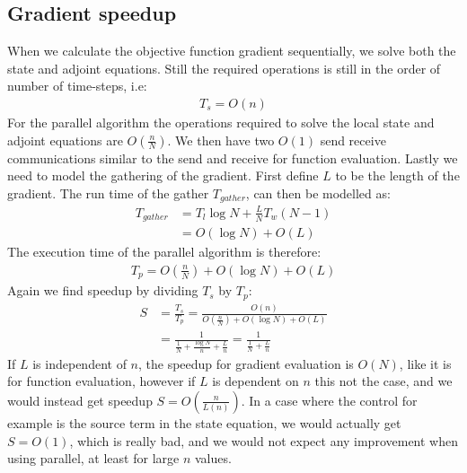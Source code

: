 \subsection{Gradient speedup}
When we calculate the objective function gradient sequentially, we solve both the state and adjoint equations. Still the required operations is still in the order of number of time-steps, i.e:
\begin{align*}
T_s = O(n)
\end{align*}
For the parallel algorithm the operations required to solve the local state and adjoint equations are $O(\frac{n}{N})$. We then have two $O(1)$ send receive communications similar to the send and receive for function evaluation. Lastly we need to model the gathering of the gradient. First define $L$ to be the length of the gradient. The run time of the gather $T_{gather}$, can then be modelled as:
\begin{align*}
T_{gather} &= T_l\log N + \frac{L}{N}T_w(N-1) \\
&= O(\log N) + O(L)
\end{align*}
The execution time of the parallel algorithm is therefore:
\begin{align*}
T_p = O(\frac{n}{N}) + O(\log N) + O(L)
\end{align*}
Again we find speedup by dividing $T_s$ by $T_p$:
\begin{align*}
S &= \frac{T_s}{T_p} = \frac{O(n)}{O(\frac{n}{N}) + O(\log N) + O(L)} \\
&=\frac{1}{\frac{1}{N} + \frac{\log N}{n}+\frac{L}{n}} = \frac{1}{\frac{1}{N} +\frac{L}{n}}
\end{align*}
If $L$ is independent of $n$, the speedup for gradient evaluation is $O(N)$, like it is for function evaluation, however if $L$ is dependent on $n$ this not the case, and we would instead get speedup $S=O(\frac{n}{L(n)})$. In a case where the control for example is the source term in the state equation, we would actually get $S=O(1)$, which is really bad, and we would not expect any improvement when using parallel, at least for large $n$ values.
